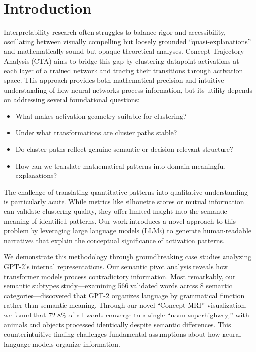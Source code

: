 \section{Introduction}

Interpretability research often struggles to balance rigor and accessibility, oscillating between visually compelling but loosely grounded ``quasi-explanations'' and mathematically sound but opaque theoretical analyses. Concept Trajectory Analysis (CTA) aims to bridge this gap by clustering datapoint activations at each layer of a trained network and tracing their transitions through activation space. This approach provides both mathematical precision and intuitive understanding of how neural networks process information, but its utility depends on addressing several foundational questions:

\begin{itemize}
    \item What makes activation geometry suitable for clustering?
    \item Under what transformations are cluster paths stable?
    \item Do cluster paths reflect genuine semantic or decision-relevant structure?
    \item How can we translate mathematical patterns into domain-meaningful explanations?
\end{itemize}

The challenge of translating quantitative patterns into qualitative understanding is particularly acute. While metrics like silhouette scores or mutual information can validate clustering quality, they offer limited insight into the semantic meaning of identified patterns. Our work introduces a novel approach to this problem by leveraging large language models (LLMs) to generate human-readable narratives that explain the conceptual significance of activation patterns.

We demonstrate this methodology through groundbreaking case studies analyzing GPT-2's internal representations. Our semantic pivot analysis reveals how transformer models process contradictory information. Most remarkably, our semantic subtypes study—examining 566 validated words across 8 semantic categories—discovered that GPT-2 organizes language by grammatical function rather than semantic meaning. Through our novel ``Concept MRI'' visualization, we found that 72.8\% of all words converge to a single ``noun superhighway,'' with animals and objects processed identically despite semantic differences. This counterintuitive finding challenges fundamental assumptions about how neural language models organize information.

